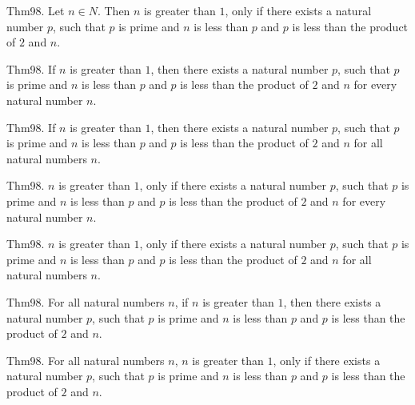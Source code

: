 \documentclass{article}
\begin{document}
Thm98. Let $n \in N$. Then $n$ is greater than $1$, only if there exists a natural number $p$, such that $p$ is prime and $n$ is less than $p$ and $p$ is less than the product of $2$ and $n$.

Thm98. If $n$ is greater than $1$, then there exists a natural number $p$, such that $p$ is prime and $n$ is less than $p$ and $p$ is less than the product of $2$ and $n$ for every natural number $n$.

Thm98. If $n$ is greater than $1$, then there exists a natural number $p$, such that $p$ is prime and $n$ is less than $p$ and $p$ is less than the product of $2$ and $n$ for all natural numbers $n$.

Thm98. $n$ is greater than $1$, only if there exists a natural number $p$, such that $p$ is prime and $n$ is less than $p$ and $p$ is less than the product of $2$ and $n$ for every natural number $n$.

Thm98. $n$ is greater than $1$, only if there exists a natural number $p$, such that $p$ is prime and $n$ is less than $p$ and $p$ is less than the product of $2$ and $n$ for all natural numbers $n$.

Thm98. For all natural numbers $n$, if $n$ is greater than $1$, then there exists a natural number $p$, such that $p$ is prime and $n$ is less than $p$ and $p$ is less than the product of $2$ and $n$.

Thm98. For all natural numbers $n$, $n$ is greater than $1$, only if there exists a natural number $p$, such that $p$ is prime and $n$ is less than $p$ and $p$ is less than the product of $2$ and $n$.
\end{document}
